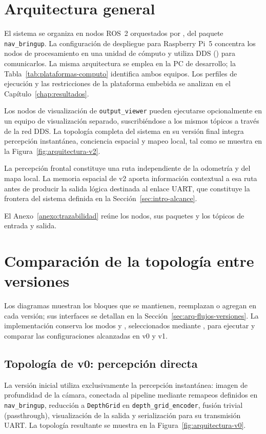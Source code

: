 \section{Arquitectura general}
\label{sec:arquitectura-general}

El sistema se organiza en nodos ROS~2 orquestados por , del paquete
\texttt{nav\_bringup}. La configuración de despliegue para Raspberry Pi~5 concentra los nodos de
procesamiento en una unidad de cómputo y utiliza DDS () para
comunicarlos. La misma arquitectura se emplea en la PC de desarrollo; la
Tabla~\ref{tab:plataformas-computo} identifica ambos equipos. Los perfiles de ejecución y las
restricciones de la plataforma embebida se analizan en el Capítulo~\ref{chap:resultados}.

Los nodos de visualización de \texttt{output\_viewer} pueden ejecutarse opcionalmente en un equipo
de visualización separado, suscribiéndose a los mismos tópicos a través de la red DDS. La topología
completa del sistema en su versión final integra percepción instantánea, conciencia espacial y
mapeo local, tal como se muestra en la Figura~\ref{fig:arquitectura-v2}.

La percepción frontal constituye una ruta independiente de la odometría y del mapa local. La
memoria espacial de v2 aporta información contextual a esa ruta antes de producir la salida lógica
destinada al enlace UART, que constituye la frontera del sistema definida en la
Sección~\ref{sec:intro-alcance}.

El Anexo~\ref{anexo:trazabilidad} reúne los nodos, sus paquetes y los tópicos de entrada y salida.

\section{Comparación de la topología entre versiones}
\label{sec:arq-versiones}

Los diagramas muestran los bloques que se mantienen, reemplazan o agregan en cada versión; sus
interfaces se detallan en la Sección~\ref{sec:arq-flujos-versiones}. La implementación conserva los
modos  y , seleccionados mediante , para ejecutar y
comparar las configuraciones alcanzadas en v0 y v1.

\subsection{Topología de v0: percepción directa}
La versión inicial utiliza exclusivamente la percepción instantánea: imagen de profundidad de la
cámara, conectada al pipeline mediante remapeos definidos en \texttt{nav\_bringup}, reducción a
\texttt{DepthGrid} en \texttt{depth\_grid\_encoder}, fusión trivial (passthrough), visualización de
la salida y serialización para su transmisión UART. La topología resultante se muestra en la
Figura~\ref{fig:arquitectura-v0}.

